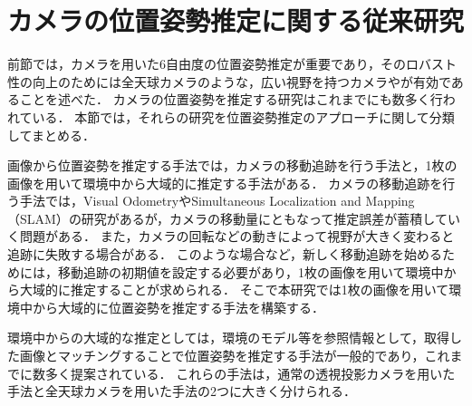 \clearpage
\section{カメラの位置姿勢推定に関する従来研究}
\label{Previous_study}

前節では，カメラを用いた6自由度の位置姿勢推定が重要であり，そのロバスト性の向上のためには全天球カメラのような，広い視野を持つカメラやが有効であることを述べた．
カメラの位置姿勢を推定する研究はこれまでにも数多く行われている．
本節では，それらの研究を位置姿勢推定のアプローチに関して分類してまとめる．
\vspace{\baselineskip}

画像から位置姿勢を推定する手法では，カメラの移動追跡を行う手法と，1枚の画像を用いて環境中から大域的に推定する手法がある．
カメラの移動追跡を行う手法では，Visual Odometry\mbox{\cite{Nister2004}}やSimultaneous Localization and Mapping（SLAM）\mbox{\cite{Klein2007}}\mbox{\cite{Caruso2015}}の研究があるが，カメラの移動量にともなって推定誤差が蓄積していく問題がある．
また，カメラの回転などの動きによって視野が大きく変わると追跡に失敗する場合がある\mbox{\cite{酒井2014}}．
このような場合など，新しく移動追跡を始めるためには，移動追跡の初期値を設定する必要があり，1枚の画像を用いて環境中から大域的に推定することが求められる．
そこで本研究では1枚の画像を用いて環境中から大域的に位置姿勢を推定する手法を構築する．
\vspace{\baselineskip}

環境中からの大域的な推定としては，環境のモデル等を参照情報として，取得した画像とマッチングすることで位置姿勢を推定する手法が一般的であり，これまでに数多く提案されている．
これらの手法は，通常の透視投影カメラを用いた手法と全天球カメラを用いた手法の2つに大きく分けられる．
\\


